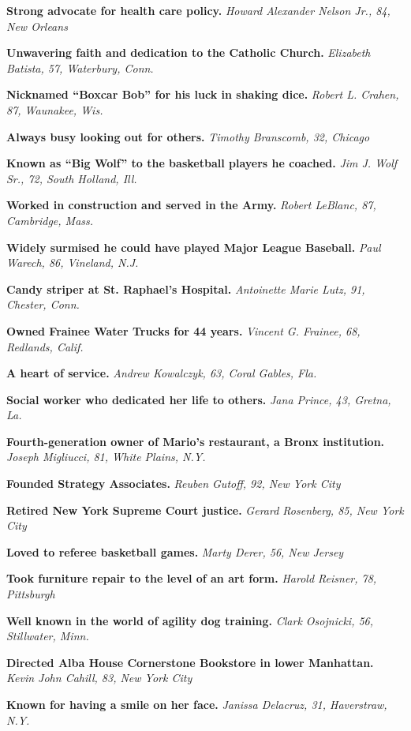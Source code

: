 \textbf{Strong advocate for health care policy.} \emph{Howard Alexander
Nelson Jr., 84, New Orleans}

\textbf{Unwavering faith and dedication to the Catholic Church.}
\emph{Elizabeth Batista, 57, Waterbury, Conn.}

\textbf{Nicknamed ``Boxcar Bob'' for his luck in shaking dice.}
\emph{Robert L. Crahen, 87, Waunakee, Wis.}

\textbf{Always busy looking out for others.} \emph{Timothy Branscomb,
32, Chicago}

\textbf{Known as ``Big Wolf'' to the basketball players he coached.}
\emph{Jim J. Wolf Sr., 72, South Holland, Ill.}

\textbf{Worked in construction and served in the Army.} \emph{Robert
LeBlanc, 87, Cambridge, Mass.}

\textbf{Widely surmised he could have played Major League Baseball.}
\emph{Paul Warech, 86, Vineland, N.J.}

\textbf{Candy striper at St. Raphael's Hospital.} \emph{Antoinette Marie
Lutz, 91, Chester, Conn.}

\textbf{Owned Frainee Water Trucks for 44 years.} \emph{Vincent G.
Frainee, 68, Redlands, Calif.}

\textbf{A heart of service.} \emph{Andrew Kowalczyk, 63, Coral Gables,
Fla.}

\textbf{Social worker who dedicated her life to others.} \emph{Jana
Prince, 43, Gretna, La.}

\textbf{Fourth-generation owner of Mario's restaurant, a Bronx
institution.} \emph{Joseph Migliucci, 81, White Plains, N.Y.}

\textbf{Founded Strategy Associates.} \emph{Reuben Gutoff, 92, New York
City}

\textbf{Retired New York Supreme Court justice.} \emph{Gerard Rosenberg,
85, New York City}

\textbf{Loved to referee basketball games.} \emph{Marty Derer, 56, New
Jersey}

\textbf{Took furniture repair to the level of an art form.} \emph{Harold
Reisner, 78, Pittsburgh}

\textbf{Well known in the world of agility dog training.} \emph{Clark
Osojnicki, 56, Stillwater, Minn.}

\textbf{Directed Alba House Cornerstone Bookstore in lower Manhattan.}
\emph{Kevin John Cahill, 83, New York City}

\textbf{Known for having a smile on her face.} \emph{Janissa Delacruz,
31, Haverstraw, N.Y.}

